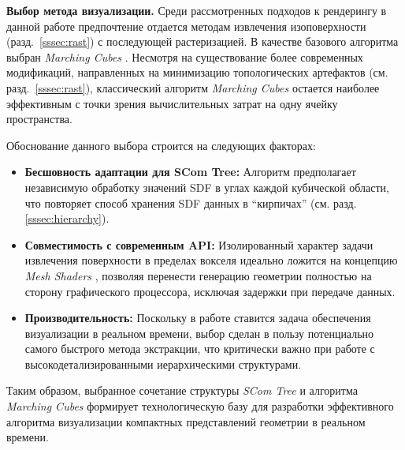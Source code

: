 \textbf{Выбор метода визуализации.} Среди рассмотренных подходов к рендерингу в данной работе предпочтение отдается методам извлечения изоповерхности (разд.~\ref{sssec:rast}) с последующей растеризацией. В качестве базового алгоритма выбран \textit{Marching Cubes} \cite{lorensen1987marching}. Несмотря на существование более современных модификаций, направленных на минимизацию топологических артефактов (см. разд.~\ref{sssec:rast}), классический алгоритм \textit{Marching Cubes} остается наиболее эффективным с точки зрения вычислительных затрат на одну ячейку пространства.

Обоснование данного выбора строится на следующих факторах:
\begin{itemize}
  \item \textbf{Бесшовность адаптации для SCom Tree:} Алгоритм предполагает независимую обработку значений SDF в углах каждой кубической области, что повторяет способ хранения SDF данных в ``кирпичах'' (см. разд. \ref{sssec:hierarchy}).
  \item \textbf{Совместимость с современным API:} Изолированный характер задачи извлечения поверхности в пределах вокселя идеально ложится на концепцию \textit{Mesh Shaders} \cite{nvidia_mesh_shaders}, позволяя перенести генерацию геометрии полностью на сторону графического процессора, исключая задержки при передаче данных.
    \item \textbf{Производительность:} Поскольку в работе ставится задача обеспечения визуализации в реальном времени, выбор сделан в пользу потенциально самого быстрого метода экстракции, что критически важно при работе с высокодетализированными иерархическими структурами.
\end{itemize}

Таким образом, выбранное сочетание структуры \textit{SCom Tree} \cite{garifullin2025compact} и алгоритма \textit{Marching Cubes} \cite{lorensen1987marching} формирует технологическую базу для разработки эффективного алгоритма визуализации компактных представлений геометрии в реальном времени.
